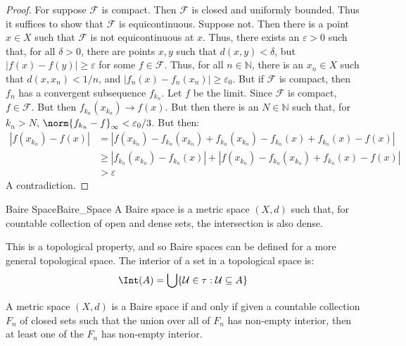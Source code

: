     \begin{proof}
        For suppose $\mathscr{F}$ is compact. Then $\mathscr{F}$
        is closed and uniformly bounded. Thus it suffices to
        show that $\mathscr{F}$ is equicontinuous. Suppose not.
        Then there is a point $x\in{X}$ such that
        $\mathscr{F}$ is not equicontinuous at $x$. Thus,
        there exists an $\varepsilon>0$ such that, for all
        $\delta>0$, there are points $x,y$ such that
        $d(x,y)<\delta$, but $|f(x)-f(y)|\geq\varepsilon$
        for some $f\in\mathscr{F}$. Thus, for all
        $n\in\mathbb{N}$, there is an $x_{n}\in{X}$ such that
        $d(x,x_{n})<1/n$, and
        $|f_{n}(x)-f_{n}(x_{n})|\geq\varepsilon_{0}$. But if
        $\mathscr{F}$ is compact, then $f_{n}$ has a convergent
        subsequence $f_{k_{n}}$. Let $f$ be the limit.
        Since $\mathscr{F}$ is compact, $f\in\mathscr{F}$.
        But then $f_{k_{n}}(x_{k_{n}})\rightarrow{f}(x)$. But
        then there is an $N\in\mathbb{N}$ such that,
        for $k_{n}>N$,
        $\norm{f_{k_{n}}-f}_{\infty}<\varepsilon_{0}/3$.
        But then:
        \begin{align}
            |f(x_{k_{n}})-f(x)|&=
            |f(x_{k_{n}})-f_{k_{n}}(x_{k_{n}})
            +f_{k_{n}}(x_{k_{n}})-f_{k_{n}}(x)
            +f_{k_{n}}(x)-f(x)|\\
            &\geq|f_{k_{n}}(x_{k_{n}})-f_{k_{n}}(x)|+
            |f(x_{k_{n}})-f_{k_{n}}(x_{k_{n}})
            +f_{k_{n}}(x)-f(x)|\\
            &>\varepsilon
        \end{align}
        A contradiction.
    \end{proof}
    \begin{ldefinition}{Baire Space}{Baire_Space}
        A Baire space is a metric space $(X,d)$ such that, for
        countable collection of open and dense sets, the
        intersection is also dense.
    \end{ldefinition}
    This is a topological property, and so Baire spaces can
    be defined for a more general topological space. The
    interior of a set in a topological space is:
    \begin{equation}
        \Int(A)=\bigcup\{\mathcal{U}\in\tau:\mathcal{U}\subseteq{A}\}
    \end{equation}
    \begin{theorem}
    A metric space $(X,d)$ is a Baire space if and only
    if given a countable collection $F_{n}$ of closed
    sets such that the union over all of $F_{n}$ has
    non-empty interior, then at least one of the $F_{n}$
    has non-empty interior.
    \end{theorem}
